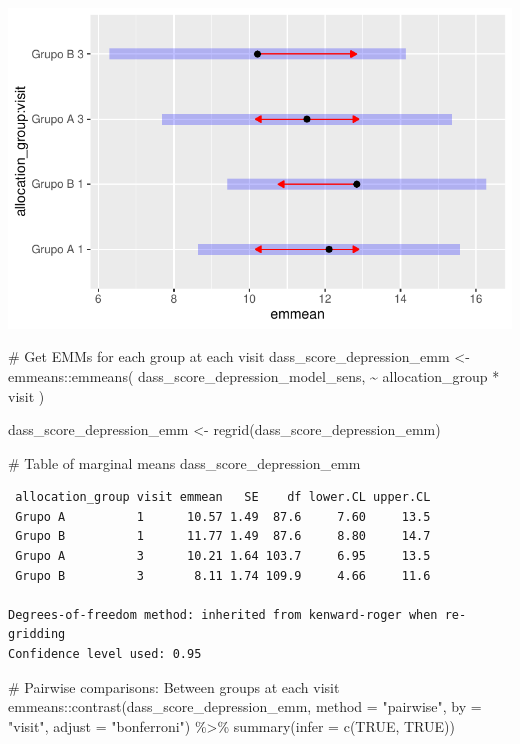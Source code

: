 \documentclass[
  letterpaper,
  DIV=11,
  numbers=noendperiod]{scrartcl}
\newenvironment{Shaded}{\begin{snugshade}}{\end{snugshade}}
\newcommand{\AttributeTok}[1]{\textcolor[rgb]{0.40,0.45,0.13}{#1}}
\newcommand{\CommentTok}[1]{\textcolor[rgb]{0.37,0.37,0.37}{#1}}
\newcommand{\ConstantTok}[1]{\textcolor[rgb]{0.56,0.35,0.01}{#1}}
\newcommand{\FunctionTok}[1]{\textcolor[rgb]{0.28,0.35,0.67}{#1}}
\newcommand{\NormalTok}[1]{\textcolor[rgb]{0.00,0.23,0.31}{#1}}
\newcommand{\OtherTok}[1]{\textcolor[rgb]{0.00,0.23,0.31}{#1}}
\newcommand{\SpecialCharTok}[1]{\textcolor[rgb]{0.37,0.37,0.37}{#1}}
\newcommand{\StringTok}[1]{\textcolor[rgb]{0.13,0.47,0.30}{#1}}
\begin{document}
\includegraphics{Outcomes_V1V2V3_files/figure-pdf/dass_score_depression_raw_emm-1.pdf}

\begin{Shaded}
\begin{Highlighting}[]
\CommentTok{\# Get EMMs for each group at each visit}
\NormalTok{dass\_score\_depression\_emm }\OtherTok{\textless{}{-}}\NormalTok{ emmeans}\SpecialCharTok{::}\FunctionTok{emmeans}\NormalTok{(}
\NormalTok{    dass\_score\_depression\_model\_sens, }
    \SpecialCharTok{\textasciitilde{}}\NormalTok{ allocation\_group }\SpecialCharTok{*}\NormalTok{ visit}
\NormalTok{)}

\NormalTok{dass\_score\_depression\_emm }\OtherTok{\textless{}{-}} \FunctionTok{regrid}\NormalTok{(dass\_score\_depression\_emm)}

\CommentTok{\# Table of marginal means}
\NormalTok{dass\_score\_depression\_emm}
\end{Highlighting}
\end{Shaded}

\begin{verbatim}
 allocation_group visit emmean   SE    df lower.CL upper.CL
 Grupo A          1      10.57 1.49  87.6     7.60     13.5
 Grupo B          1      11.77 1.49  87.6     8.80     14.7
 Grupo A          3      10.21 1.64 103.7     6.95     13.5
 Grupo B          3       8.11 1.74 109.9     4.66     11.6

Degrees-of-freedom method: inherited from kenward-roger when re-gridding 
Confidence level used: 0.95 
\end{verbatim}

\begin{Shaded}
\begin{Highlighting}[]
\CommentTok{\# Pairwise comparisons: Between groups at each visit}
\NormalTok{emmeans}\SpecialCharTok{::}\FunctionTok{contrast}\NormalTok{(dass\_score\_depression\_emm, }\AttributeTok{method =} \StringTok{"pairwise"}\NormalTok{, }\AttributeTok{by =} \StringTok{"visit"}\NormalTok{, }\AttributeTok{adjust =} \StringTok{"bonferroni"}\NormalTok{) }\SpecialCharTok{\%\textgreater{}\%} \FunctionTok{summary}\NormalTok{(}\AttributeTok{infer =} \FunctionTok{c}\NormalTok{(}\ConstantTok{TRUE}\NormalTok{, }\ConstantTok{TRUE}\NormalTok{))}
\end{Highlighting}
\end{Shaded}
\end{document}
